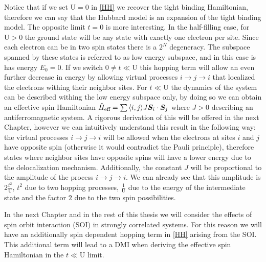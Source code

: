 Notice that if we set $\text{U}=0$ in \ref{HH} we recover the tight binding Hamiltonian, therefore we can say that the Hubbard model is an expansion of the tight binding model. The opposite limit $t=0$ is more interesting. In the half-filling case, for $\text{U}>0$ the ground state will be any state with exactly one electron per site. Since each electron can be in two spin states there is a $2^N$ degeneracy. The subspace spanned by these states is referred to as low energy subspace, and in this case is has energy $E_0 = 0$. If we switch $0 \neq t \ll \text{U}$ this hopping term will allow an even further decrease in energy by allowing virtual processes $i \rightarrow j \rightarrow i$ that localized the electrons withing their neighbor sites. For $t \ll \text{U}$ the dynamics of the system can be described withing the low energy subspace only, by doing so we can obtain an effective spin Hamiltonian $\hat{H}_{\text{eff}} = \sum{\langle i,j \rangle} J \boldsymbol{S}_i\cdot\boldsymbol{S}_j$ where $J>0$ describing an antiferromagnetic system. A rigorous derivation of this will be offered in the next Chapter, however we can intuitively understand this result in the following way: the virtual processes $i \rightarrow j \rightarrow i$ will be allowed when the electrons at sites $i$ and $j$ have opposite spin (otherwise it would contradict the Pauli principle), therefore states where neighbor sites have opposite spins will have a lower energy due to the delocalization mechanism. Additionally, the constant $J$ will be proportional to the amplitude of the process $i \rightarrow j \rightarrow i$. We can already see that this amplitude is $2\frac{t^2}{\text{U}}$, $t^2$ due to two hopping processes, $\frac{1}{\text{U}}$ due to the energy of the intermediate state and the factor $2$ due to the two spin possibilities.

In the next Chapter and in the rest of this thesis we will consider the effects of spin orbit interaction (SOI) in strongly correlated systems. For this reason we will have an additionally spin dependent hopping term in \ref{HH} arising from the SOI. This additional term will lead to a DMI when deriving the effective spin Hamiltonian in the $t \ll \text{U}$ limit.






